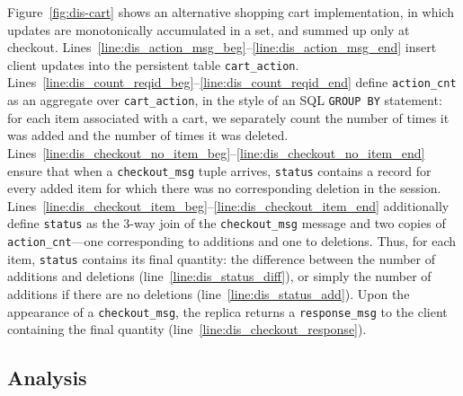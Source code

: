 Figure~\ref{fig:dis-cart} shows an alternative shopping cart implementation, in
which updates are monotonically accumulated in a set, and summed up only at
checkout.  Lines~\ref{line:dis_action_msg_beg}--\ref{line:dis_action_msg_end}
insert client updates into the persistent table \texttt{cart\_action}.
Lines~\ref{line:dis_count_reqid_beg}--\ref{line:dis_count_reqid_end} define
\texttt{action\_cnt} as an aggregate over \texttt{cart\_action}, in the style of
an SQL \texttt{GROUP BY} statement: for each item associated with a cart, we
separately count the number of times it was added and the number of times it was
deleted.
Lines~\ref{line:dis_checkout_no_item_beg}--\ref{line:dis_checkout_no_item_end}
ensure that when a \texttt{checkout\_msg} tuple arrives, \texttt{status}
contains a record for every added item for which there was no corresponding
deletion in the session.
Lines~\ref{line:dis_checkout_item_beg}--\ref{line:dis_checkout_item_end}
additionally define \texttt{status} as the 3-way join of the
\texttt{checkout\_msg} message and two copies of \texttt{action\_cnt}---one
corresponding to additions and one to deletions.  Thus, for each item,
\texttt{status} contains its final quantity: the difference between the number
of additions and deletions (line~\ref{line:dis_status_diff}), or simply the
number of additions if there are no deletions (line~\ref{line:dis_status_add}).
Upon the appearance of a \texttt{checkout\_msg}, the replica returns a
\texttt{response\_msg} to the client containing the final quantity
(line~\ref{line:dis_checkout_response}).


\subsection{Analysis}

